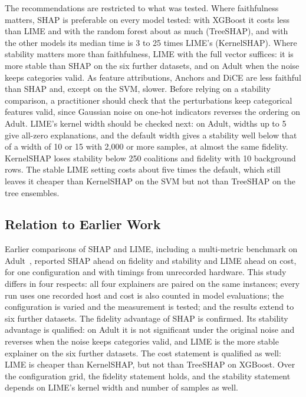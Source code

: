 \documentclass[11pt,a4paper]{article}
\begin{document}
The recommendations are restricted to what was tested. Where
faithfulness matters, SHAP is preferable on every model tested: with
XGBoost it costs less than LIME and with the random forest about as much
(TreeSHAP), and with the other models its median time is 3 to 25 times
LIME's (KernelSHAP). Where stability matters more than faithfulness, LIME with the
full vector suffices: it is more stable than SHAP on the six further
datasets, and on Adult when the noise keeps categories valid.
As feature attributions, Anchors and DiCE are less faithful than SHAP and,
except on the SVM, slower. Before relying on a stability comparison, a
practitioner should check that the perturbations keep categorical features
valid, since Gaussian noise on one-hot indicators reverses the ordering on
Adult. LIME's kernel width should be checked next: on Adult, widths up to 5
give all-zero explanations, and the default width gives a stability well below
that of a width of 10 or 15 with 2,000 or more samples, at almost the same
fidelity. KernelSHAP loses stability below 250 coalitions and fidelity with
10 background rows. The stable LIME setting costs about five times the
default, which still leaves it cheaper than KernelSHAP on the SVM but not
than TreeSHAP on the tree ensembles.

\subsection{Relation to Earlier Work}

Earlier comparisons of SHAP and LIME, including a multi-metric benchmark on
Adult~\cite{herrera2026framework}, reported SHAP ahead on fidelity and
stability and LIME ahead on cost, for one configuration and with timings
from unrecorded hardware. This study differs in four respects: all four
explainers are paired on the same instances; every run uses one recorded
host and cost is also counted in model evaluations; the configuration is
varied and the measurement is tested; and the results extend to six further
datasets. The fidelity advantage of SHAP is confirmed. Its stability
advantage is qualified: on Adult it is not significant under the original
noise and reverses when the noise keeps categories valid, and LIME is the
more stable explainer on the six further datasets. The cost statement is
qualified as well: LIME is cheaper than KernelSHAP, but not than TreeSHAP on
XGBoost. Over the configuration grid, the fidelity statement holds, and
the stability statement depends on LIME's kernel width and number of samples
as well.
\end{document}

